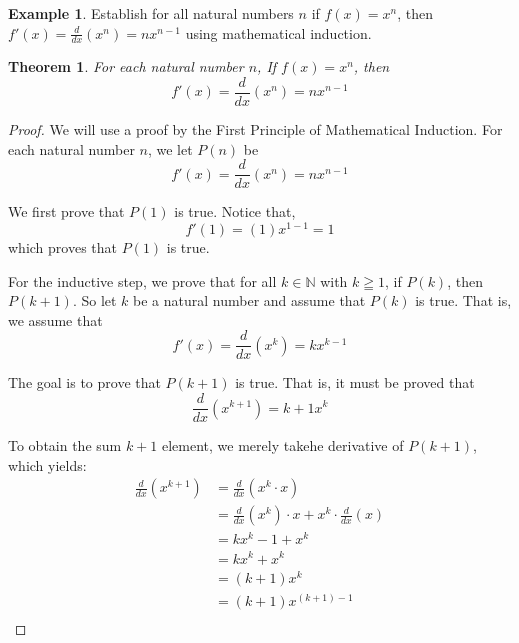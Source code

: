 \documentclass{book}
\newtheorem{theorem}{Theorem}[section]
\theoremstyle{definition}
\newtheorem{example}{Example}[definition]
\theoremstyle{remark}
\newcommand{\bb}[1]{\mathbb{#1}}
\newcommand{\m}{\cdot}
\begin{document}
\newpage
\begin{example}


Establish for all natural numbers $n$ if $f(x) = x^n$, then $f'(x) = \frac{d}{dx}(x^n) = nx^{n-1}$ using mathematical induction.
    \begin{tcolorbox}
        \begin{theorem}
        For each natural number $n$, If $f(x) = x^n$, then
            \begin{equation*}
                f'(x) = \frac{d}{dx}(x^n) = nx^{n-1}
            \end{equation*} 
        \end{theorem}
    \end{tcolorbox}

    \begin{proof}
        We will use a proof by the First Principle of Mathematical Induction. For each natural number $n$, we let $P(n)$ be
            \begin{equation*}
                f'(x) = \frac{d}{dx}(x^n) = nx^{n-1}
            \end{equation*} 
        
        We first prove that $P(1)$ is true. Notice that,
            \begin{equation*}
                f'(1) = (1)x^{1-1} = 1
            \end{equation*} 
        which proves that $P(1)$ is true. 
        
        For the inductive step, we prove that for all $k \in \bb{N}$ with $k \geqq 1$, if $P(k)$, then $P(k+1)$. So let $k$ be a natural number and assume that $P(k)$ is true. That is, we assume that 
            \begin{equation*}
                f'(x) = \frac{d}{dx}(x^k) = kx^{k-1}
            \end{equation*} 
        
        The goal is to prove that $P(k+1)$ is true. That is, it must be proved that  
            \begin{equation}
            \label{dne6}
                \frac{d}{dx}(x^{k+1}) = {k+1}x^{k}          
            \end{equation}
        
        To obtain the sum $k+1$ element, we merely takehe derivative of $P(k+1)$, which yields: 
            \begin{align*}
                \frac{d}{dx}(x^{k+1}) & = \frac{d}{dx}(x^k \m x) \\
                    & = \frac{d}{dx}(x^k) \m x + x^k \m \frac{d}{dx}(x) \\
                    & = kx^k-1 + x^k \\
                    & = kx^k + x^k \\
                    & = (k + 1)x^k \\
                    & = (k + 1)x^{(k+1)-1} \\
            \end{align*}        


\end{proof}
\end{example}
\end{document}
